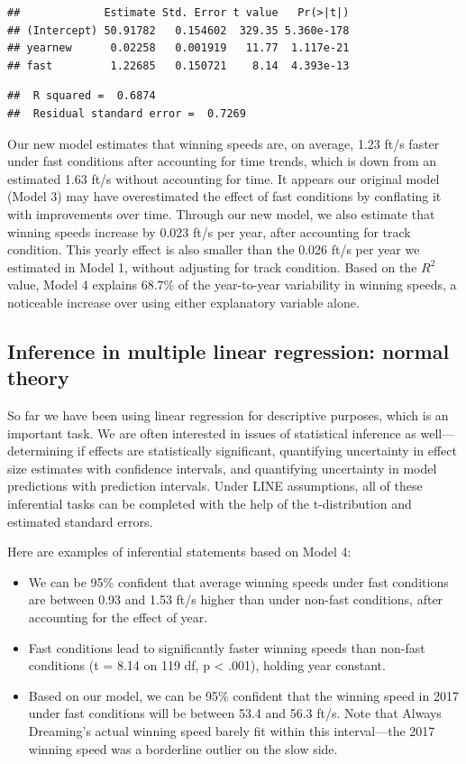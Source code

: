 \documentclass[
]{krantz}
\providecommand{\tightlist}{%
  \setlength{\itemsep}{0pt}\setlength{\parskip}{0pt}}
\begin{document}
\begin{verbatim}
##             Estimate Std. Error t value   Pr(>|t|)
## (Intercept) 50.91782   0.154602  329.35 5.360e-178
## yearnew      0.02258   0.001919   11.77  1.117e-21
## fast         1.22685   0.150721    8.14  4.393e-13
\end{verbatim}

\begin{verbatim}
##  R squared =  0.6874 
##  Residual standard error =  0.7269
\end{verbatim}

Our new model estimates that winning speeds are, on average, 1.23 ft/s faster under fast conditions after accounting for time trends, which is down from an estimated 1.63 ft/s without accounting for time. It appears our original model (Model 3) may have overestimated the effect of fast conditions by conflating it with improvements over time. Through our new model, we also estimate that winning speeds increase by 0.023 ft/s per year, after accounting for track condition. This yearly effect is also smaller than the 0.026 ft/s per year we estimated in Model 1, without adjusting for track condition. Based on the \(R^2\) value, Model 4 explains 68.7\% of the year-to-year variability in winning speeds, a noticeable increase over using either explanatory variable alone.

\hypertarget{multreg-inference}{%
\subsection{Inference in multiple linear regression: normal theory}\label{multreg-inference}}

So far we have been using linear regression for descriptive purposes, which is an important task. We are often interested in issues of statistical inference  as well---determining if effects are statistically significant, quantifying uncertainty in effect size estimates with confidence intervals, and quantifying uncertainty in model predictions with prediction intervals. Under LINE assumptions, all of these inferential tasks can be completed with the help of the t-distribution and estimated standard errors.

Here are examples of inferential statements based on Model 4:

\begin{itemize}
\tightlist
\item
  We can be 95\% confident that average winning speeds under fast conditions are between 0.93 and 1.53 ft/s higher than under non-fast conditions, after accounting for the effect of year.
\item
  Fast conditions lead to significantly faster winning speeds than non-fast conditions (t = 8.14 on 119 df, p \textless{} .001), holding year constant.
\item
  Based on our model, we can be 95\% confident that the winning speed in 2017 under fast conditions will be between 53.4 and 56.3 ft/s. Note that Always Dreaming's actual winning speed barely fit within this interval---the 2017 winning speed was a borderline outlier on the slow side.
\end{itemize}
\end{document}
